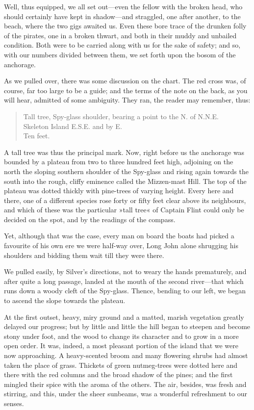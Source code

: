 Well, thus equipped, we all set out—even the fellow with the broken head, who should certainly have kept in shadow—and straggled, one after another, to the beach, where the two gigs awaited us. Even these bore trace of the drunken folly of the pirates, one in a broken thwart, and both in their muddy and unbailed condition. Both were to be carried along with us for the sake of safety; and so, with our numbers divided between them, we set forth upon the bosom of the anchorage.

As we pulled over, there was some discussion on the chart. The red cross was, of course, far too large to be a guide; and the terms of the note on the back, as you will hear, admitted of some ambiguity. They ran, the reader may remember, thus:

\blockquote{Tall tree, Spy-glass shoulder, bearing a point to the N. of N.N.E.\\
Skeleton Island E.S.E. and by E.\\
Ten feet.}

A tall tree was thus the principal mark. Now, right before us the anchorage was bounded by a plateau from two to three hundred feet high, adjoining on the north the sloping southern shoulder of the Spy-glass and rising again towards the south into the rough, cliffy eminence called the Mizzen-mast Hill. The top of the plateau was dotted thickly with pine-trees of varying height. Every here and there, one of a different species rose forty or fifty feet clear above its neighbours, and which of these was the particular »tall tree« of Captain Flint could only be decided on the spot, and by the readings of the compass.

Yet, although that was the case, every man on board the boats had picked a favourite of his own ere we were half-way over, Long John alone shrugging his shoulders and bidding them wait till they were there.

We pulled easily, by Silver's directions, not to weary the hands prematurely, and after quite a long passage, landed at the mouth of the second river—that which runs down a woody cleft of the Spy-glass. Thence, bending to our left, we began to ascend the slope towards the plateau.

At the first outset, heavy, miry ground and a matted, marish vegetation greatly delayed our progress; but by little and little the hill began to steepen and become stony under foot, and the wood to change its character and to grow in a more open order. It was, indeed, a most pleasant portion of the island that we were now approaching. A heavy-scented broom and many flowering shrubs had almost taken the place of grass. Thickets of green nutmeg-trees were dotted here and there with the red columns and the broad shadow of the pines; and the first mingled their spice with the aroma of the others. The air, besides, was fresh and stirring, and this, under the sheer sunbeams, was a wonderful refreshment to our senses.

